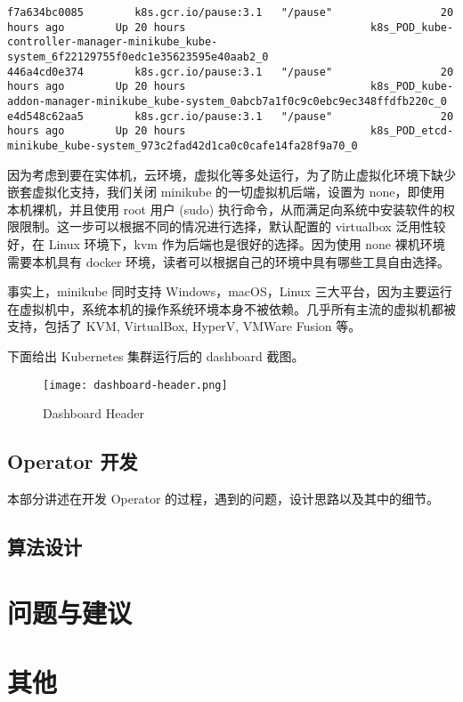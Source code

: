 \begin{lstlisting}
f7a634bc0085        k8s.gcr.io/pause:3.1   "/pause"                 20 hours ago        Up 20 hours                             k8s_POD_kube-controller-manager-minikube_kube-system_6f22129755f0edc1e35623595e40aab2_0
446a4cd0e374        k8s.gcr.io/pause:3.1   "/pause"                 20 hours ago        Up 20 hours                             k8s_POD_kube-addon-manager-minikube_kube-system_0abcb7a1f0c9c0ebc9ec348ffdfb220c_0
e4d548c62aa5        k8s.gcr.io/pause:3.1   "/pause"                 20 hours ago        Up 20 hours                             k8s_POD_etcd-minikube_kube-system_973c2fad42d1ca0c0cafe14fa28f9a70_0
\end{lstlisting}

因为考虑到要在实体机，云环境，虚拟化等多处运行，为了防止虚拟化环境下缺少嵌套虚拟化支持，我们关闭 minikube 的一切虚拟机后端，设置为 none，即使用本机裸机，并且使用 root 用户 (sudo) 执行命令，从而满足向系统中安装软件的权限限制。这一步可以根据不同的情况进行选择，默认配置的 virtualbox 泛用性较好，在 Linux 环境下，kvm 作为后端也是很好的选择。因为使用 none 裸机环境需要本机具有 docker 环境，读者可以根据自己的环境中具有哪些工具自由选择。

事实上，minikube 同时支持 Windows，macOS，Linux 三大平台，因为主要运行在虚拟机中，系统本机的操作系统环境本身不被依赖。几乎所有主流的虚拟机都被支持，包括了 KVM, VirtualBox, HyperV, VMWare Fusion 等。

下面给出 Kubernetes 集群运行后的 dashboard 截图。

\begin{figure}
    \texttt{[image: dashboard-header.png]}
    \caption{Dashboard Header}
\end{figure}

\subsection{Operator 开发}

本部分讲述在开发 Operator 的过程，遇到的问题，设计思路以及其中的细节。

\subsection{算法设计}

\section{问题与建议}

\section{其他}
